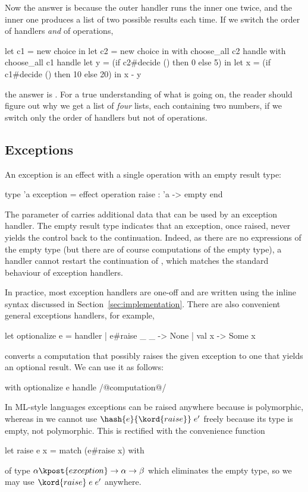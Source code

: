 %
Now the answer is \inline{[[10;5];[20;15]]} because the outer handler runs the inner one twice, and the inner one produces a list of two possible results each time. If we switch the order of handlers \emph{and} of operations,
%
\begin{source}
let c1 = new choice in
let c2 = new choice in
  with choose_all c2 handle
  with choose_all c1 handle
    let y = (if c2#decide () then 0 else 5) in
    let x = (if c1#decide () then 10 else 20) in
      x - y
\end{source}
%
the answer is \inline{[[10;20];[5;15]]}. For a true understanding of what is going on, the reader should figure out why we get a list of \emph{four} lists, each containing two numbers, if we switch only the order of handlers but not of operations.

\subsection{Exceptions}
\label{sec:exceptions}

An exception is an effect with a single operation  with an empty result type:
%
\begin{source}
type 'a exception = effect
  operation raise : 'a -> empty
end
\end{source}
%
The parameter of  carries additional data that can be used by an exception handler. The empty result type indicates that an exception, once raised, never yields the control back to the continuation. Indeed, as there are no expressions of the empty type (but there are of course computations of the empty type), a handler cannot restart the continuation of , which matches the standard behaviour of exception handlers.

In practice, most exception handlers are one-off and are written using the inline syntax discussed in Section~\ref{sec:implementation}. There are also convenient general exceptions handlers, for example,
%
\begin{source}
let optionalize e = handler
  | e#raise _ _ -> None
  | val x -> Some x
\end{source}
%
converts a computation that possibly raises the given exception  to one that yields an optional result. We can use it as follows:
%
\begin{source}
with optionalize e handle
  /@computation@/
\end{source}
%
In ML-style languages exceptions can be raised anywhere because  is polymorphic, whereas in \eff we cannot use $\hash{e}{\kord{raise}} \; e'$ freely because its type is empty, not polymorphic. This is rectified with the convenience function
%
\begin{source}
let raise e x = match (e#raise x) with
\end{source}
%
of type $\alpha \kpost{exception} \to \alpha \to \beta$ which eliminates the empty type, so we may use $\kord{raise} \; e \; e'$ anywhere.

